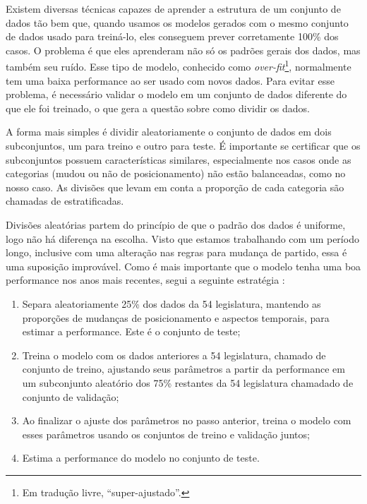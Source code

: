 \documentclass[a4paper,titlepage]{ppgi}\usepackage[]{graphicx}\usepackage[]{color}
\begin{document}



Existem diversas técnicas capazes de aprender a estrutura de um conjunto de
dados tão bem que, quando usamos os modelos gerados com o mesmo conjunto de
dados usado para treiná-lo, eles conseguem prever corretamente 100\% dos casos.
O problema é que eles aprenderam não só os padrões gerais dos dados, mas também
seu ruído. Esse tipo de modelo, conhecido como \emph{over-fit}\footnote{Em
tradução livre, ``super-ajustado''.}, normalmente tem uma baixa performance
ao ser usado com novos dados. Para evitar esse problema, é necessário validar o
modelo em um conjunto de dados diferente do que ele foi treinado, o que gera a
questão sobre como dividir os dados.

A forma mais simples é dividir aleatoriamente o conjunto de dados em dois
subconjuntos, um para treino e outro para teste. É importante se certificar que
os subconjuntos possuem características similares, especialmente nos casos onde
as categorias (mudou ou não de posicionamento) não estão balanceadas, como no
nosso caso. As divisões que levam em conta a proporção de cada categoria são
chamadas de estratificadas.

Divisões aleatórias partem do princípio de que o padrão dos dados é uniforme,
logo não há diferença na escolha. Visto que estamos trabalhando com um período
longo, inclusive com uma alteração nas regras para mudança de partido, essa é
uma suposição improvável. Como é mais importante que o modelo tenha uma boa
performance nos anos mais recentes, segui a seguinte estratégia
\cite[Capítulo~12.1]{Kuhn2013}:

\begin{enumerate}
\item Separa aleatoriamente 25\% dos dados da 54\textordfeminine{} legislatura,
mantendo as proporções de mudanças de posicionamento e aspectos temporais, para
estimar a performance. Este é o conjunto de teste;
\item Treina o modelo com os dados anteriores a 54\textordfeminine{}
legislatura, chamado de conjunto de treino, ajustando seus parâmetros a partir
da performance em um subconjunto aleatório dos 75\% restantes da
54\textordfeminine{} legislatura chamadado de conjunto de validação;
\item Ao finalizar o ajuste dos parâmetros no passo anterior, treina o modelo
com esses parâmetros usando os conjuntos de treino e validação juntos;
\item Estima a performance do modelo no conjunto de teste.
\end{enumerate}
\end{document}
